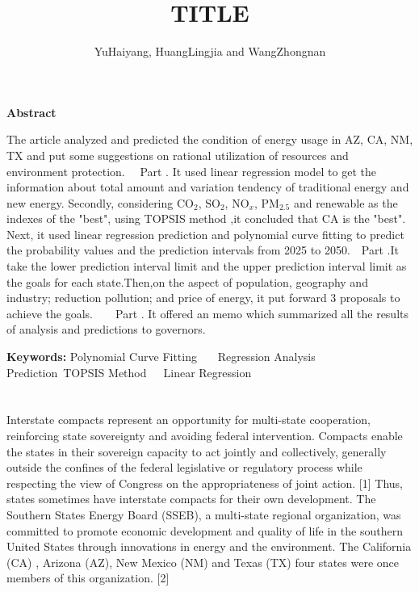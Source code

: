 \documentclass[12pt]{article}
\title{}
\title{TITLE}
\author{YuHaiyang, HuangLingjia and WangZhongnan}
\date{}
\begin{document}
\maketitle
\setlength{\baselineskip}{15pt}
\begin{center}

\end{center}

\noindent \textbf{\large Abstract}

\noindent The article analyzed and predicted the condition of energy usage in AZ, CA, NM, TX and put some suggestions on rational utilization of resources and environment protection. \ \ {Part \uppercase\expandafter{}.} It used linear regression model to get the information about total amount and variation tendency of traditional energy and new energy. Secondly, considering $\mathrm{CO_{2}}$, $\mathrm{SO_{2}}$, $\mathrm{NO}_{x}$, $\mathrm{PM_{2.5}}$ and renewable as the indexes of the "best", using TOPSIS method ,it concluded that CA is the "best". Next, it used linear regression prediction and polynomial curve fitting to predict the probability values and the prediction intervals from 2025 to 2050.{\ \ Part
\uppercase\expandafter{}}.It take the lower prediction interval limit and the upper prediction interval limit as the goals for each state.Then,on the aspect of population, geography and industry; reduction pollution; and price of energy, it put forward 3 proposals to achieve the goals.\ \
{\ \ Part \uppercase\expandafter{}.} It offered an memo which summarized all the results of analysis and predictions to governors.


\noindent \textbf{ Keywords:} Polynomial Curve Fitting \ \ \ Regression Analysis Prediction\  TOPSIS Method\ \ \ Linear Regression

\newpage
\tableofcontents
\newpage
\section{}

\noindent Interstate compacts represent an opportunity for multi-state cooperation, reinforcing state sovereignty and avoiding federal intervention. Compacts enable the states in their sovereign capacity to act jointly and collectively, generally outside the confines of the federal legislative or regulatory process while respecting the view of Congress on the appropriateness of joint action. [1] Thus, states sometimes have interstate compacts for their own development. The Southern States Energy Board (SSEB), a multi-state regional organization, was committed to promote economic development and quality of life in the southern United States through innovations in energy and the environment. The California (CA) , Arizona (AZ), New Mexico (NM) and Texas (TX) four states were once members of this organization. [2]
\end{document}

